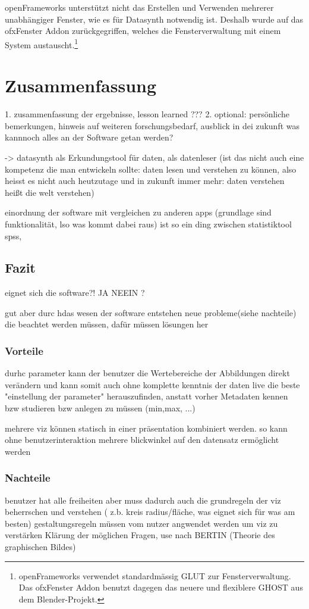 \documentclass[a4paper, 12pt, DIVcalc, onepage, pdftex, headsepline, footsepline]{scrreprt}
\begin{document}
openFrameworks unterstützt nicht das Erstellen und Verwenden mehrerer
unabhängiger Fenster, wie es für Datasynth notwendig ist. Deshalb wurde
auf das ofxFenster Addon zurückgegriffen, welches die Fensterverwaltung
mit einem System austauscht.\footnote{openFrameworks verwendet standardmässig GLUT
zur Fensterverwaltung. Das ofxFenster Addon benutzt dagegen das neuere und
flexiblere GHOST aus dem Blender-Projekt.}

\chapter{Zusammenfassung}
\label{cha:Zusammenfassung}
1. zusammenfassung der ergebnisse, lesson learned
???
2. optional: persönliche bemerkungen, hinweis auf weiteren forschungsbedarf, ausblick in dei zukunft
was kannnoch alles an der Software getan werden?

-> datasynth als Erkundungstool für daten, als datenleser (ist das nicht auch eine kompetenz
die man entwickeln sollte: daten lesen und verstehen zu können, also heisst es nicht auch heutzutage
und in zukunft immer mehr: daten verstehen heißt die welt verstehen)

einordnung der software mit vergleichen zu anderen apps (grundlage sind funktionalität, 
lso was kommt dabei raus) ist so ein ding zwischen statistiktool spss, 

\section{Fazit}
\label{sec:Fazit}
eignet sich die software?! JA NEEIN ?

gut aber durc hdas wesen der software entstehen neue probleme(siehe nachteile)
die beachtet werden müssen, dafür müssen lösungen her

\subsection{Vorteile}
\label{sec:Vorteile}
durhc parameter kann der benutzer die Wertebereiche der Abbildungen direkt verändern
und kann somit auch ohne komplette kenntnis der daten live die beste "einstellung
der parameter" herauszufinden, anstatt vorher Metadaten kennen bzw studieren bzw anlegen zu müssen (min,max, ...)

mehrere viz können statisch in einer präsentation kombiniert werden. so kann ohne
benutzerinteraktion mehrere blickwinkel auf den datensatz ermöglicht werden

\subsection{Nachteile}
\label{sec:Nachteile}
benutzer hat alle freiheiten aber muss dadurch auch die grundregeln der viz beherrschen
und verstehen ( z.b. kreis radius/fläche, was eignet sich für was am besten)
gestaltungsregeln müssen vom nutzer angwendet werden um viz zu verstärken
Klärung der möglichen Fragen, use nach BERTIN (Theorie des graphischen Bildes)
\end{document}
